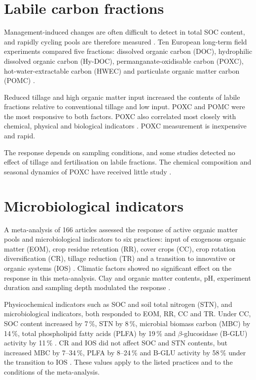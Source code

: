 \documentclass[english]{ai4science_ysda}
\begin{document}
\section{Labile carbon fractions}

\porozhdeno{} Management-induced changes are often difficult to detect in total
SOC content, and rapidly cycling pools are therefore measured
\cite{bongiorno2019}. Ten European long-term field experiments compared five
fractions: dissolved organic carbon (DOC), hydrophilic dissolved organic carbon
(Hy-DOC), permanganate-oxidisable carbon (POXC), hot-water-extractable carbon
(HWEC) and particulate organic matter carbon (POMC) \cite{bongiorno2019}.

Reduced tillage and high organic matter input increased the contents of labile
fractions relative to conventional tillage and low input. POXC and POMC were the
most responsive to both factors. POXC also correlated most closely with chemical,
physical and biological indicators \cite{bongiorno2019}. POXC measurement is
inexpensive and rapid.

The response depends on sampling conditions, and some studies detected no effect
of tillage and fertilisation on labile fractions. The chemical composition and
seasonal dynamics of POXC have received little study \cite{bongiorno2019}.

\section{Microbiological indicators}

\porozhdeno{} A meta-analysis of 166 articles assessed the response of active
organic matter pools and microbiological indicators to six practices: input of
exogenous organic matter (EOM), crop residue retention (RR), cover crops (CC),
crop rotation diversification (CR), tillage reduction (TR) and a transition to
innovative or organic systems (IOS) \cite{cusset2024}. Climatic factors showed
no significant effect on the response in this meta-analysis. Clay and organic
matter contents, pH, experiment duration and sampling depth modulated the
response \cite{cusset2024}.

Physicochemical indicators such as SOC and soil total nitrogen (STN), and
microbiological indicators, both responded to EOM, RR, CC and TR. Under CC, SOC
content increased by 7\,\%, STN by 8\,\%, microbial biomass carbon (MBC) by
14\,\%, total phospholipid fatty acids (PLFA) by 19\,\% and $\beta$-glucosidase
(B-GLU) activity by 11\,\% \cite{cusset2024}. CR and IOS did not affect SOC and
STN contents, but increased MBC by 7--34\,\%, PLFA by 8--24\,\% and B-GLU
activity by 58\,\% under the transition to IOS \cite{cusset2024}. These values
apply to the listed practices and to the conditions of the meta-analysis.
\end{document}

